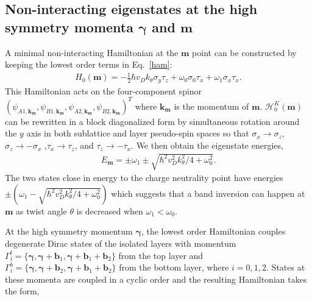 \documentclass[aps,prl,reprint,amssymb,groupedaddress,twocolumn]{revtex4}
\begin{document}
\subsection{Non-interacting eigenstates at the high symmetry momenta  \texorpdfstring{$\bm{\gamma}$}{$\gamma$} and \texorpdfstring{$\bm{m}$}{$m$}}

A minimal non-interacting Hamiltonian at  the $\bm{m}$ point can be constructed by keeping the lowest order terms in 
Eq.~\ref{ham}: 
\begin{align}
	H_0(\bm{m}) = -\frac{1}{2} \hbar v_D k_{\theta} \sigma_y \tau_z + \omega_0 \sigma_0 \tau_x + \omega_1 \sigma_x\tau_x.
	\label{ham_m}
\end{align}
This Hamiltonian acts on the four-component spinor 
$(\psi_{A1, \bm{k}_{\bm{m}}}, \psi_{B1, \bm{k}_{\bm{m}}}, \psi_{A2, \bm{k}_{\bm{m}}}, \psi_{B2, \bm{k}_{\bm{m}}})^T$ 
where $\bm{k}_{\bm{m}}$ is the momentum of $\bm{m}$.
$\mathcal{H}_0^K(\bm{m}) $ can be rewritten in a block diagonalized form by simultaneous rotation around 
the $y$ axis in both sublattice and layer pseudo-spin spaces so that
$\sigma_x\rightarrow\sigma_z$, $\sigma_z\rightarrow-\sigma_x$ ,$\tau_x\rightarrow\tau_z$, and $\tau_z\rightarrow-\tau_x$. 
We then obtain the eigenstate energies,
\begin{align}
	E_{\bm{m}} = \pm \omega_1 \pm \sqrt{\hbar^2 v_D^2 k_{\theta}^2/4+\omega_0^2}.
\end{align}
The two states close in energy to the charge neutrality point have energies $\pm(\omega_1 - \sqrt{\hbar^2 v_D^2 k_{\theta}^2/4+\omega_0^2})$
which suggests that a band inversion can happen at $\bm{m}$ as twist angle $\theta$ is decreased when $\omega_1 < \omega_0$.  

At the high symmetry momentum $\bm{\gamma}$, the lowest order Hamiltonian couples degenerate Dirac states of the isolated layers with momentum 
$\Gamma^t_i=\{\bm{\gamma}, \bm{\gamma}+\bm{b}_1, \bm{\gamma}+\bm{b}_1+\bm{b}_2\}$ from the top layer and $\Gamma^b_i=\{\bm{\gamma}, \bm{\gamma}+\bm{b}_2, \bm{\gamma}+\bm{b}_1+\bm{b}_2\}$ from the bottom layer, where $i=0,1,2$.
States at these momenta are coupled in a cyclic order and the resulting Hamiltonian takes the form,
\end{document}
